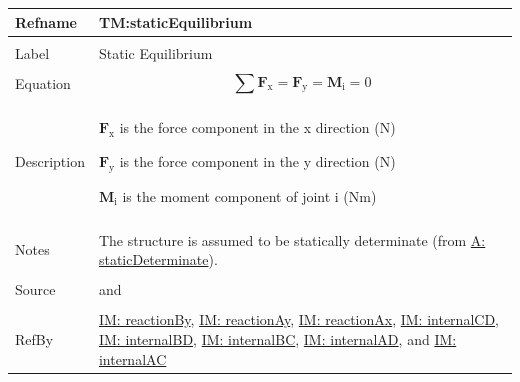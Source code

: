 \documentclass[12pt]{article}
\begin{document}
\vspace{\baselineskip}
\noindent
\begin{minipage}{\textwidth}
\begin{tabular}{>{\raggedright}p{}>{\raggedright\arraybackslash}p{}}
\toprule \textbf{Refname} & \textbf{TM:staticEquilibrium}
\label{TM:staticEquilibrium}
\\ \midrule \\
Label & Static Equilibrium
        
\\ \midrule \\
Equation & \begin{displaymath}
           \displaystyle\sum{{\mathbf{F}_{\text{x}}}={\mathbf{F}_{\text{y}}}={\mathbf{M}_{\text{i}}}=0}
           \end{displaymath}
\\ \midrule \\
Description & \begin{symbDescription}
              \item{${\mathbf{F}_{\text{x}}}$ is the force component in the x direction (${\text{N}}$)}
              \item{${\mathbf{F}_{\text{y}}}$ is the force component in the y direction (${\text{N}}$)}
              \item{${\mathbf{M}_{\text{i}}}$ is the moment component of joint i ($\text{N}\text{m}$)}
              \end{symbDescription}
\\ \midrule \\
Notes & The structure is assumed to be statically determinate (from \hyperref[staticDeterminate]{A: staticDeterminate}).
        
\\ \midrule \\
Source & \cite{mofjWiki} and \cite{momentWiki}
         
\\ \midrule \\
RefBy & \hyperref[IM:reactionBy]{IM: reactionBy}, \hyperref[IM:reactionAy]{IM: reactionAy}, \hyperref[IM:reactionAx]{IM: reactionAx}, \hyperref[IM:internalCD]{IM: internalCD}, \hyperref[IM:internalBD]{IM: internalBD}, \hyperref[IM:internalBC]{IM: internalBC}, \hyperref[IM:internalAD]{IM: internalAD}, and \hyperref[IM:internalAC]{IM: internalAC}
        
\\ \bottomrule
\end{tabular}
\end{minipage}
\end{document}
